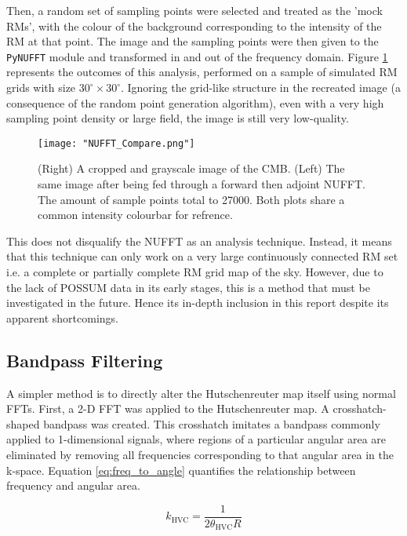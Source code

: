 Then, a random set of sampling points were selected and treated as the 'mock RMs', with the colour of the background corresponding to the intensity of the RM at that point. The image and the sampling points were then given to the \verb|PyNUFFT| module and transformed in and out of the frequency domain. Figure \ref{fig:nufft} represents the outcomes of this analysis, performed on a sample of simulated RM grids with size $30^{\circ}\times 30^{\circ}$. Ignoring the grid-like structure in the recreated image (a consequence of the random point generation algorithm), even with a very high sampling point density or large field, the image is still very low-quality.

\begin{figure}
    \texttt{[image: "NUFFT\_Compare.png"]}
    \centering
    \caption{(Right) A cropped and grayscale image of the CMB. (Left) The same image after being fed through a forward then adjoint NUFFT. The amount of sample points total to 27000. Both plots share a common intensity colourbar for refrence.}
    \label{fig:nufft}
\end{figure}


This does not disqualify the NUFFT as an analysis technique. Instead, it means that this technique can only work on a very large continuously connected RM set i.e. a complete or partially complete RM grid map of the sky. However, due to the lack of POSSUM data in its early stages, this is a method that must be investigated in the future. Hence its in-depth inclusion in this report despite its apparent shortcomings.

\subsection{Bandpass Filtering}
\label{ssec:bandpass}

A simpler method is to directly alter the Hutschenreuter map itself using normal FFTs. First, a 2-D FFT was applied to the Hutschenreuter map. A crosshatch-shaped bandpass was created. This crosshatch imitates a bandpass commonly applied to 1-dimensional signals, where regions of a particular angular area are eliminated by removing all frequencies corresponding to that angular area in the k-space. Equation \ref{eq:freq_to_angle} quantifies the relationship between frequency and angular area.


\begin{equation}
        k_{\mathrm{HVC}} = \frac{1}{2 \theta_{\mathrm{HVC}} R}
    \label{eq:freq_to_angle}
\end{equation}


